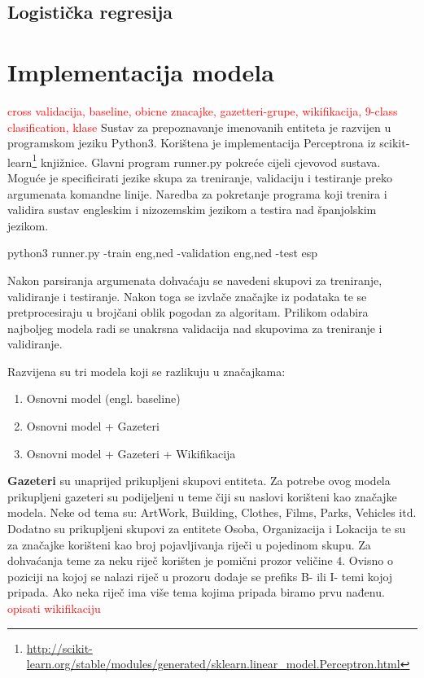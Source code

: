 \documentclass[times, utf8, seminar]{fer}
\newcommand\myworries[1]{\textcolor{red}{#1}}
\begin{document}
\section{Logistička regresija}


\chapter{Implementacija modela}
\myworries{cross validacija, baseline, obicne znacajke, gazetteri-grupe, wikifikacija, 9-class clasification, klase}
Sustav za prepoznavanje imenovanih entiteta je razvijen u programskom jeziku Python3. Korištena je implementacija Perceptrona iz scikit-learn\footnote{\url{http://scikit-learn.org/stable/modules/generated/sklearn.linear_model.Perceptron.html}} knjižnice. 
Glavni program runner.py pokreće cijeli cjevovod sustava. Moguće je specificirati jezike skupa za treniranje, validaciju i testiranje preko argumenata komandne linije. Naredba za pokretanje programa koji trenira i validira sustav engleskim i nizozemskim jezikom a testira nad španjolskim jezikom.
\begin{center}
python3 runner.py -train eng,ned -validation eng,ned -test esp
\end{center}

Nakon parsiranja argumenata dohvaćaju se navedeni skupovi za treniranje, validiranje i testiranje. Nakon toga se izvlače značajke iz podataka te se pretprocesiraju u brojčani oblik pogodan za algoritam. Prilikom odabira najboljeg modela radi se unakrsna validacija nad skupovima za treniranje i validiranje. 

Razvijena su tri modela koji se razlikuju u značajkama:
\begin{enumerate}
\item Osnovni model (engl. baseline) 
\item Osnovni model + Gazeteri
\item Osnovni model + Gazeteri + Wikifikacija
\end{enumerate}
\textbf{Gazeteri} su unaprijed prikupljeni skupovi entiteta. Za potrebe ovog modela prikupljeni gazeteri su podijeljeni u teme čiji su naslovi korišteni kao značajke modela. Neke od tema su: ArtWork, Building, Clothes, Films, Parks, Vehicles itd. Dodatno su prikupljeni skupovi za entitete Osoba, Organizacija i Lokacija te su za značajke korišteni kao broj pojavljivanja riječi u pojedinom skupu. Za dohvaćanja teme za neku riječ korišten je pomični prozor veličine $ 4 $. Ovisno o poziciji na kojoj se nalazi riječ u prozoru dodaje se prefiks B- ili I- temi kojoj pripada. Ako neka riječ ima više tema kojima pripada biramo prvu nađenu.\citep{DBLP:conf/conll/TsaiMR16}
\newpage
\myworries{opisati wikifikaciju}
\end{document}
